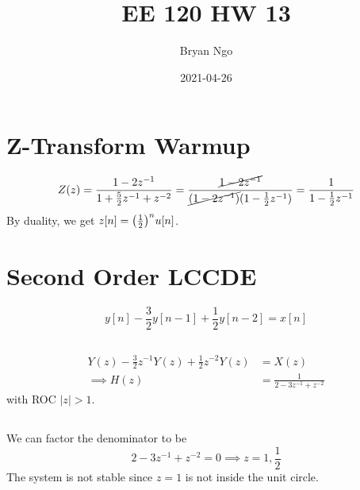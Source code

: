 \documentclass{article}
\title{EE 120 HW 13}
\author{Bryan Ngo}
\date{2021-04-26}
\begin{document}
\maketitle

\section{Z-Transform Warmup}

\begin{equation}
    Z(z) = \frac{1 - 2z^{-1}}{1 + \frac{5}{2} z^{-1} + z^{-2}} = \frac{\cancel{1 - 2z^{-1}}}{\cancel{(1 - 2z^{-1})} (1 - \frac{1}{2} z^{-1})} = \frac{1}{1 - \frac{1}{2} z^{-1}}
\end{equation}
By duality, we get \(z[n] = \qty(\frac{1}{2})^n u[n]\).

\section{Second Order LCCDE}

\begin{equation}
    y[n] - \frac{3}{2} y[n - 1] + \frac{1}{2} y[n - 2] = x[n]
\end{equation}

\subsection{}

\begin{align}
    Y(z) - \frac{3}{2} z^{-1} Y(z) + \frac{1}{2} z^{-2} Y(z) &= X(z) \\
    \implies H(z) &= \frac{1}{2 - 3z^{-1} + z^{-2}}
\end{align}
with ROC \(|z| > 1\).

\subsection{}

We can factor the denominator to be
\begin{equation}
    2 - 3z^{-1} + z^{-2} = 0 \implies z = 1, \frac{1}{2}
\end{equation}
The system is not stable since \(z = 1\) is not inside the unit circle.

\subsection{}
\end{document}
